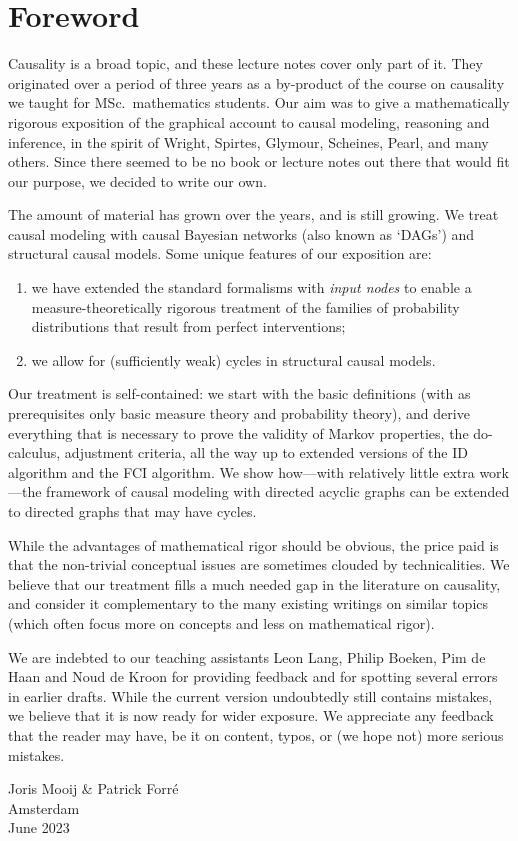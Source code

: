 \section*{Foreword}

Causality is a broad topic, and these lecture notes cover only part of it. 
They originated over a period of three years as a by-product of the course on causality we taught for MSc.\ mathematics students. 
Our aim was to give a mathematically rigorous exposition of the graphical account to causal modeling, reasoning and inference, in the spirit of Wright, Spirtes, Glymour, Scheines, Pearl, and many others. 
Since there seemed to be no book or lecture notes out there that would fit our purpose, we decided to write our own.

The amount of material has grown over the years, and is still growing.
We treat causal modeling with causal Bayesian networks (also known as `DAGs') and structural causal models. 
Some unique features of our exposition are:
\begin{enumerate}
\item we have extended the standard formalisms with \emph{input nodes} to enable a measure-theoretically rigorous treatment of the families of probability distributions that result from perfect interventions;
\item we allow for (sufficiently weak) cycles in structural causal models.
\end{enumerate}
Our treatment is self-contained: we start with the basic definitions (with as prerequisites only basic measure theory and probability theory), and derive everything that is necessary to prove the validity of Markov properties, the do-calculus, adjustment criteria, all the way up to extended versions of the ID algorithm and the FCI algorithm.
We show how---with relatively little extra work---the framework of causal modeling with directed acyclic graphs can be extended to directed graphs that may have cycles.

While the advantages of mathematical rigor should be obvious, the price paid is that the non-trivial conceptual issues are sometimes clouded by technicalities.
We believe that our treatment fills a much needed gap in the literature on causality, and consider it complementary to the many existing writings on similar topics (which often focus more on concepts and less on mathematical rigor).

We are indebted to our teaching assistants Leon Lang, Philip Boeken, Pim de Haan and Noud de Kroon for providing feedback and for spotting several errors in earlier drafts.
While the current version undoubtedly still contains mistakes, we believe that it is now ready for wider exposure. 
We appreciate any feedback that the reader may have, be it on content, typos, or (we hope not) more serious mistakes.


\bigskip
\bigskip
{\flushright Joris Mooij \& Patrick Forr\'e\\
Amsterdam\\
June 2023\\
}
